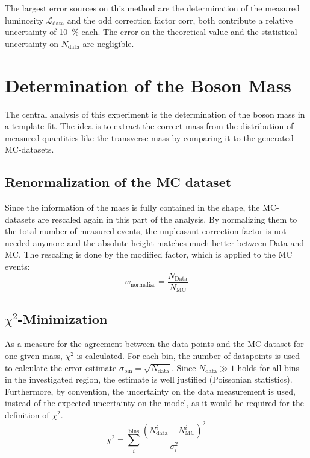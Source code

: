 \documentclass[
	paper=A4,
	parskip=full,
	chapterprefix=true,
	11pt,
	headings=normal,
	bibliography=totoc,
	listof=totoc,
	titlepage=on,
]{scrreprt}
\begin{document}
The largest error sources on this method are the determination of the measured luminosity $\mathcal{L}_\mathrm{data}$ and the odd correction factor $\mathrm{corr}$, both contribute a relative uncertainty of \SI{10}{\percent} each. The error on the theoretical value and the statistical uncertainty on $N_\mathrm{data}$ are negligible.

\chapter{Determination of the \PW Boson Mass}
The central analysis of this experiment is the determination of the \PW boson mass in a template fit. The idea is to extract the correct \PW mass from the distribution of measured quantities like the transverse mass by comparing it to the generated MC-datasets. 


\section{Renormalization of the MC dataset}
Since the information of the \PW mass is fully contained in the shape, the MC-datasets are rescaled again in this part of the analysis. By normalizing them to the total number of measured events, the unpleasant correction factor is not needed anymore and the absolute height matches much better between Data and MC. The rescaling is done by the modified factor, which is applied to the MC events:
\begin{equation}
w_{\mathrm{normalize}}=\frac{N_{\mathrm{Data}}}{N_{\mathrm{MC}}}
\end{equation}

\section{$\chi^2$-Minimization}
As a measure for the agreement between the data points and the MC dataset for one given \PW mass, $\chi^2$ is calculated. For each bin, the number of datapoints is used to calculate the error estimate $\sigma_\mathrm{bin}=\sqrt{N_\mathrm{data}}$. Since $N_\mathrm{data} \gg 1$ holds for all bins in the investigated region, the estimate is well justified (Poissonian statistics). Furthermore, by convention, the uncertainty on the data measurement is used, instead of the expected uncertainty on the model, as it would be required for the definition of $\chi^2$. 
\begin{equation}
\chi^2=\sum_i^{\mathrm{bins}} \frac{\left(N^i_\mathrm{data}-N^i_\mathrm{MC}\right)^2}{\sigma_i^2}
\label{eq:Chi2}
\end{equation}
\end{document}
